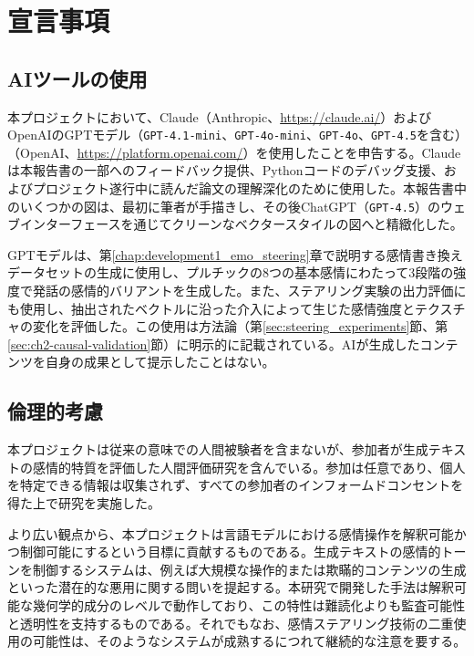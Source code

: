\chapter*{宣言事項}

\section*{AIツールの使用}

本プロジェクトにおいて、Claude（Anthropic、\url{https://claude.ai/}）およびOpenAIのGPTモデル（\texttt{GPT-4.1-mini}、\texttt{GPT-4o-mini}、\texttt{GPT-4o}、\texttt{GPT-4.5}を含む）（OpenAI、\url{https://platform.openai.com/}）を使用したことを申告する。Claudeは本報告書の一部へのフィードバック提供、Pythonコードのデバッグ支援、およびプロジェクト遂行中に読んだ論文の理解深化のために使用した。本報告書中のいくつかの図は、最初に筆者が手描きし、その後ChatGPT（\texttt{GPT-4.5}）のウェブインターフェースを通じてクリーンなベクタースタイルの図へと精緻化した。\par

GPTモデルは、第\ref{chap:development1_emo_steering}章で説明する感情書き換えデータセットの生成に使用し、プルチックの8つの基本感情にわたって3段階の強度で発話の感情的バリアントを生成した。また、ステアリング実験の出力評価にも使用し、抽出されたベクトルに沿った介入によって生じた感情強度とテクスチャの変化を評価した。この使用は方法論（第\ref{sec:steering_experiments}節、第\ref{sec:ch2-causal-validation}節）に明示的に記載されている。AIが生成したコンテンツを自身の成果として提示したことはない。\par

\section*{倫理的考慮}

本プロジェクトは従来の意味での人間被験者を含まないが、参加者が生成テキストの感情的特質を評価した人間評価研究を含んでいる。参加は任意であり、個人を特定できる情報は収集されず、すべての参加者のインフォームドコンセントを得た上で研究を実施した。\par

より広い観点から、本プロジェクトは言語モデルにおける感情操作を解釈可能かつ制御可能にするという目標に貢献するものである。生成テキストの感情的トーンを制御するシステムは、例えば大規模な操作的または欺瞞的コンテンツの生成といった潜在的な悪用に関する問いを提起する。本研究で開発した手法は解釈可能な幾何学的成分のレベルで動作しており、この特性は難読化よりも監査可能性と透明性を支持するものである。それでもなお、感情ステアリング技術の二重使用の可能性は、そのようなシステムが成熟するにつれて継続的な注意を要する。\par

